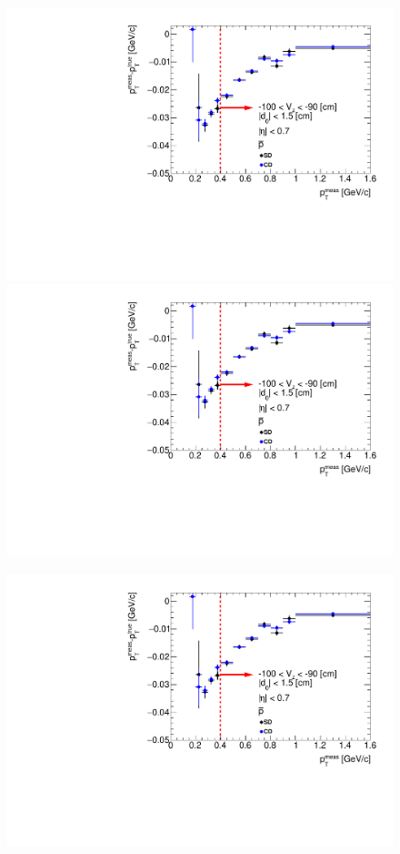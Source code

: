 \begin{figure}[H]
{  \includegraphics[width=\linewidth,page=33]{graphics/energyLoss/energyLoss3DGlobal_OnePrtAlso.pdf}\\
  \includegraphics[width=\linewidth,page=36]{graphics/energyLoss/energyLoss3DGlobal_OnePrtAlso.pdf}\\
}%
\parbox{0.329\textwidth}{
  \includegraphics[width=\linewidth,page=25]{graphics/energyLoss/energyLoss3DGlobal_OnePrtAlso.pdf}\\
}
\end{figure}
